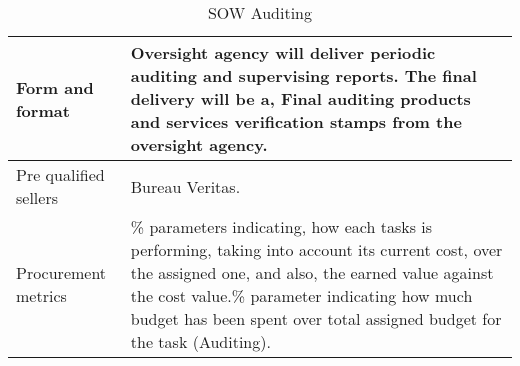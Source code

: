 \begin{table}[H]
\begin{tabular}{>{\raggedright\arraybackslash}p{3cm} >{\arraybackslash}p{11cm}}
		\midrule
		
		Form and format & Oversight agency will deliver periodic auditing and supervising reports. The final delivery will be a, Final auditing products and services verification stamps from the oversight agency.\vspace{0.2cm} \\
		
		\midrule
		
		Pre qualified sellers & Bureau Veritas.\vspace{0.2cm} \\
		
		\midrule
		
		Procurement metrics & \% parameters indicating, how each tasks is performing, taking into account its current cost, over the assigned one, and also, the earned value against the cost value.\% parameter indicating how much budget has been spent over total assigned budget for the task (Auditing).\vspace{0.2cm} \\
		
		\bottomrule[2pt]		
		
	\end{tabular}
	\caption{SOW Auditing}
\end{table}
